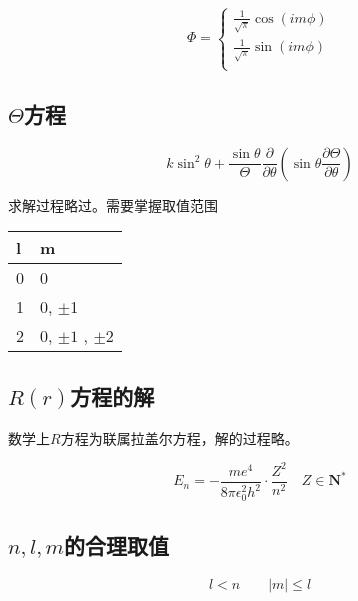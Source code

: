 \begin{equation*}
    \Phi = \begin{cases}
        \frac{1}{\sqrt{\pi}} \cos(im\phi) \\
        \frac{1}{\sqrt{\pi}} \sin(im\phi) \\
    \end{cases}
\end{equation*}


\subsection{$\Theta$方程}

\begin{equation*}
    k \sin ^2 \theta  + \frac{\sin \theta}{\Theta}   \frac{\partial}{\partial \theta} \left( \sin \theta \frac{\partial \Theta}{\partial \theta} \right)
\end{equation*}

求解过程略过。需要掌握取值范围

\begin{table}[H]
    \centering
    \begin{tabular}{ll}
        \toprule
        l & m \\
        \midrule
        0 & 0 \\
        1 & 0, $\pm$1 \\ 
        2 & 0, $\pm 1$ , $\pm 2$ \\ 
        \bottomrule
    \end{tabular}
\end{table}


\subsection{$R(r)$方程的解}

数学上$R$方程为联属拉盖尔方程，解的过程略。

\begin{equation*}
    E_n = - \frac{me^4}{8 \pi \epsilon_0^2 h^2}  \cdot \frac{Z^2}{n^2} \quad Z \in \mathbf{N} ^{*}
\end{equation*}

\subsection{$n,l,m$的合理取值}

\begin{equation*}
    l < n \qquad \left\lvert m \right\rvert \le l
\end{equation*}